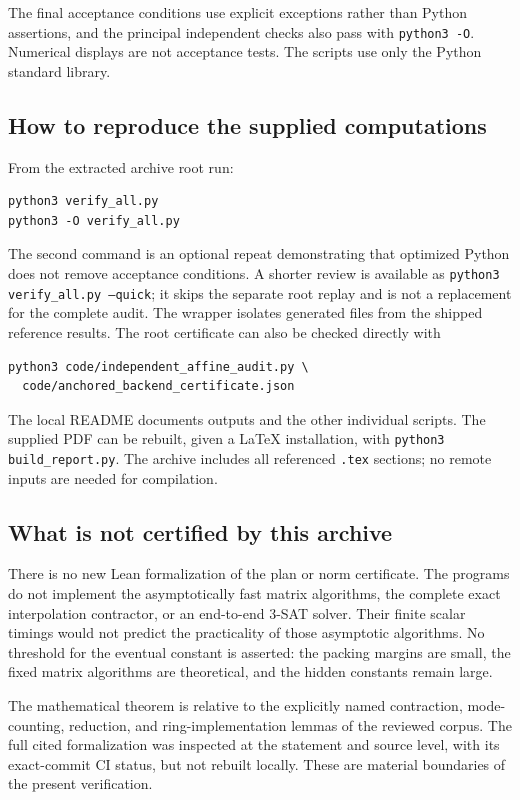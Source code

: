 The final acceptance conditions use explicit exceptions rather than
Python assertions, and the principal independent checks also pass with
\texttt{python3 -O}. Numerical displays are not acceptance tests.
The scripts use only the Python standard library.

\subsection{How to reproduce the supplied computations}

From the extracted archive root run:
\begin{verbatim}
python3 verify_all.py
python3 -O verify_all.py
\end{verbatim}
The second command is an optional repeat demonstrating that optimized
Python does not remove acceptance conditions. A shorter review is
available as \texttt{python3 verify\_all.py --quick}; it skips the separate
root replay and is not a replacement for the complete audit.
The wrapper isolates generated files from the shipped reference results.
The root certificate can also be checked directly with
\begin{verbatim}
python3 code/independent_affine_audit.py \
  code/anchored_backend_certificate.json
\end{verbatim}
The local README documents outputs and the other individual scripts.
The supplied PDF can be rebuilt, given a LaTeX installation, with
\texttt{python3 build\_report.py}. The archive includes all referenced
\texttt{.tex} sections; no remote inputs are needed for compilation.

\subsection{What is not certified by this archive}

There is no new Lean formalization of the plan or norm certificate.
The programs do not implement the asymptotically fast matrix algorithms,
the complete exact interpolation contractor, or an end-to-end 3-SAT
solver. Their finite scalar timings would not predict the practicality
of those asymptotic algorithms. No threshold for the eventual constant
is asserted: the packing margins are small, the fixed matrix algorithms
are theoretical, and the hidden constants remain large.

The mathematical theorem is relative to the explicitly named contraction,
mode-counting, reduction, and ring-implementation lemmas of the reviewed
corpus. The full cited formalization was inspected at the statement and
source level, with its exact-commit CI status, but not rebuilt locally.
These are material boundaries of the present verification.

